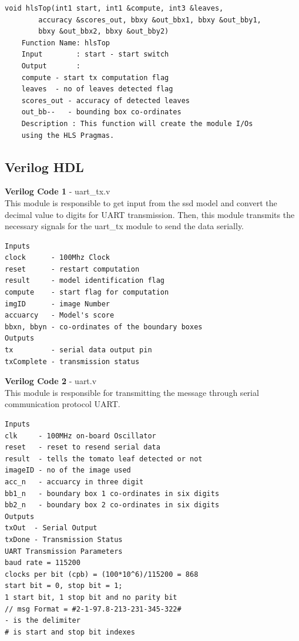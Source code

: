 \documentclass[a4paper,12pt,oneside]{book}
\begin{document}
\begin{lstlisting}
void hlsTop(int1 start, int1 &compute, int3 &leaves,
        accuracy &scores_out, bbxy &out_bbx1, bbxy &out_bby1,
        bbxy &out_bbx2, bbxy &out_bby2)
    Function Name: hlsTop
    Input        : start - start switch
    Output       :
    compute - start tx computation flag
    leaves  - no of leaves detected flag
    scores_out - accuracy of detected leaves
    out_bb--   - bounding box co-ordinates
    Description : This function will create the module I/Os
    using the HLS Pragmas.
\end{lstlisting}
\subsection*{Verilog HDL}
\textbf{Verilog Code 1} - uart\_tx.v\vspace{0.2cm}\\
This module is responsible to get input from the ssd model and
convert the decimal value to digits for UART transmission. Then,
this module transmits the necessary signals for the uart\_tx module
to send the data serially.\vspace{0.2cm}
\begin{lstlisting}
Inputs
clock      - 100Mhz Clock
reset      - restart computation
result     - model identification flag
compute    - start flag for computation
imgID      - image Number
accuarcy   - Model's score
bbxn, bbyn - co-ordinates of the boundary boxes
Outputs
tx         - serial data output pin
txComplete - transmission status
\end{lstlisting}
\textbf{Verilog Code 2} - uart.v\vspace{0.2cm}\\
This module is responsible for transmitting the message through
serial communication protocol UART.\vspace{0.2cm}
\begin{lstlisting}
Inputs
clk     - 100MHz on-board Oscillator
reset   - reset to resend serial data
result  - tells the tomato leaf detected or not
imageID - no of the image used
acc_n   - accuarcy in three digit
bb1_n   - boundary box 1 co-ordinates in six digits
bb2_n   - boundary box 2 co-ordinates in six digits
Outputs
txOut  - Serial Output
txDone - Transmission Status
UART Transmission Parameters
baud rate = 115200
clocks per bit (cpb) = (100*10^6)/115200 = 868
start bit = 0, stop bit = 1;
1 start bit, 1 stop bit and no parity bit
// msg Format = #2-1-97.8-213-231-345-322#
- is the delimiter
# is start and stop bit indexes
\end{lstlisting}
\end{document}
